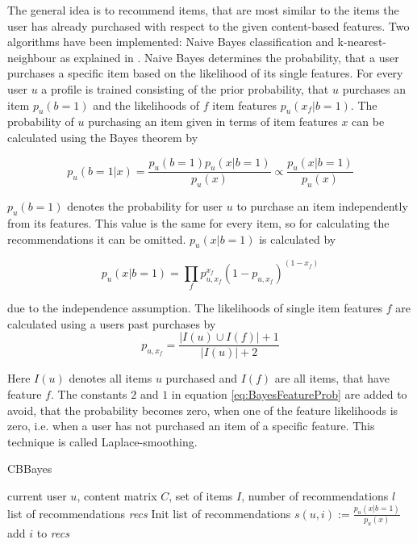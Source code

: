 \documentclass[10pt]{reportMaster}
\begin{document}
The general idea is to recommend items, that are most similar to the items the user has already purchased with respect to the given content-based features.
Two algorithms have been implemented: Naive Bayes classification and k-nearest-neighbour as explained in \cite{contentbasedPazzani}.
Naive Bayes determines the probability, that a user purchases a specific item based on the likelihood of its single features.
For every user $u$ a profile is trained consisting of the prior probability, that $u$ purchases an item $p_u(b=1)$ and  the likelihoods of $f$ item features $p_u(x_f|b=1)$.
The probability of $u$ purchasing an item given in terms of item features $x$ can be calculated using the Bayes theorem by 

$$
	p_u(b=1|x) = \frac{p_u(b=1) p_u(x|b=1)}{p_u(x)} \propto \frac{p_u(x|b=1)}{p_u(x)}
$$

$p_u(b=1)$ denotes the probability for user $u$ to purchase an item independently from its features.
This value is the same for every item, so for calculating the recommendations it can be omitted.
$p_u(x|b=1)$ is calculated by 

$$
p_u(x|b=1) = \prod_f{p_{u, x_f}^{x_f}(1-p_{u, x_f})^{(1-x_f)}}
$$

due to the independence assumption.
The likelihoods of single item features $f$ are calculated using a users past purchases by
\begin{equation}
\label{eq:BayesFeatureProb}
p_{u, x_f} = \frac{|I(u) \cup I(f)|+1}{|I(u)|+2}
\end{equation}

Here $I(u)$ denotes all items $u$ purchased and $I(f)$ are all items, that have feature $f$.
The constants $2$ and $1$ in equation \ref{eq:BayesFeatureProb} are added to avoid, that the probability becomes zero, when one of the feature likelihoods is zero, i.e. when a user has not purchased an item of a specific feature.
This technique is called Laplace-smoothing.

\begin{algorithm}
	\caption[CBBayes]{CBBayes}
	\label{alg:CBBayes}
	\begin{algorithmic}[1]
		\Require current user $u$, content matrix $C$, set of items $I$, number of recommendations $l$
		\Ensure list of recommendations \textit{recs}
		\State Init list of recommendations 
			\State 	$s(u,i) := \frac{p_u(x|b=1)}{p_u(x)}$
				\State add $i$ to \textit{recs}
			\EndIf
		\EndFor
	\end{algorithmic}	
\end{algorithm}
\end{document}
